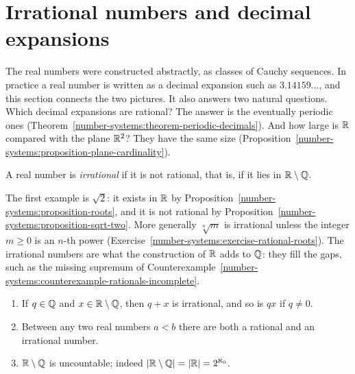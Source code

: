 \section{Irrational numbers and decimal expansions}\label{number-systems:section-decimals}

The real numbers were constructed abstractly, as classes of Cauchy sequences. In practice a real number is written as a decimal expansion such as $3.14159\ldots$, and this section connects the two
pictures. It also answers two natural questions. Which decimal expansions are rational? The answer is the eventually periodic ones (Theorem~\ref{number-systems:theorem-periodic-decimals}). And how large is
$\mathbb{R}$ compared with the plane $\mathbb{R}^2$? They have the same size (Proposition~\ref{number-systems:proposition-plane-cardinality}).

\begin{definition}\label{number-systems:definition-irrational}
A real number is \emph{irrational} if it is not rational, that is, if it lies in $\mathbb{R} \setminus \mathbb{Q}$.
\end{definition}

The first example is $\sqrt 2$: it exists in $\mathbb{R}$ by Proposition~\ref{number-systems:proposition-roots}, and it is not rational by Proposition~\ref{number-systems:proposition-sqrt-two}. More generally $\sqrt[n]{m}$ is
irrational unless the integer $m \geq 0$ is an $n$-th power (Exercise~\ref{number-systems:exercise-rational-roots}). The irrational numbers are what the construction of $\mathbb{R}$ adds to $\mathbb{Q}$: they fill the gaps,
such as the missing supremum of Counterexample~\ref{number-systems:counterexample-rationals-incomplete}.

\begin{proposition}\label{number-systems:proposition-irrationals}
\begin{enumerate}
\item If $q \in \mathbb{Q}$ and $x \in \mathbb{R} \setminus \mathbb{Q}$, then $q + x$ is irrational, and so is $qx$ if $q \neq 0$.
\item Between any two real numbers $a < b$ there are both a rational and an irrational number.
\item $\mathbb{R} \setminus \mathbb{Q}$ is uncountable; indeed $|\mathbb{R} \setminus \mathbb{Q}| = |\mathbb{R}| = 2^{\aleph_0}$.
\end{enumerate}
\end{proposition}

